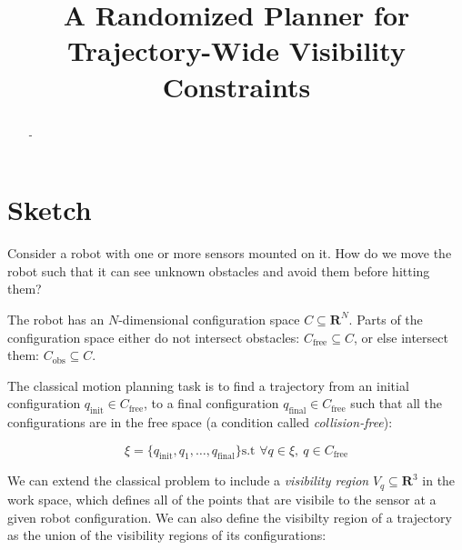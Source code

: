\documentclass[conference]{IEEEtran}
\begin{document}
\title{A Randomized Planner for Trajectory-Wide Visibility Constraints}

\author{
}

\maketitle


\begin{abstract}
-
\end{abstract}

\IEEEpeerreviewmaketitle

\newcommand{\R}{\mathbf{R}}
\newcommand{\Cfree}{C_{\text{free}}}
\newcommand{\Cobs}{C_{\text{obs}}}
\newcommand{\qinit}{q_{\text{init}}}
\newcommand{\qfinal}{q_{\text{final}}}

\section{Sketch}

Consider a robot with one or more sensors mounted on it.  How do we move the
robot such that it can see unknown obstacles and avoid them before hitting them?

The robot has an $N$-dimensional configuration space $C \subseteq \R^{N}$. Parts
of the configuration space either do not intersect obstacles: $\Cfree \subseteq C$,
or else intersect them: $\Cobs \subseteq C$. 

The classical motion planning task is to find a trajectory from an initial
configuration $\qinit \in \Cfree$, to a final configuration $\qfinal \in
\Cfree$ such that all the configurations are in the free space (a condition
called \textit{collision-free}):

$$ \xi =\{ \qinit, q_1, \ldots, \qfinal \} \text{s.t~} \forall q \in \xi,~
q\in \Cfree$$

We can extend the classical problem to include a \textit{visibility region} $V_q
\subseteq \R^3$ in the work space, which defines all of the points that are
visibile to the sensor at a given robot configuration. We can also define the
visibilty region of a trajectory as the union of  the visibility regions of its
configurations:
\end{document}
